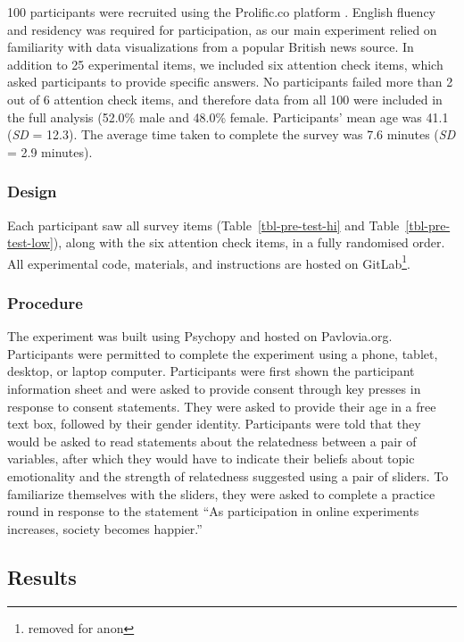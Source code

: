 \documentclass[manuscript,screen,review]{acmart}
\begin{document}
100 participants were recruited using the Prolific.co platform
\citep{prolific}. English fluency and residency was required for
participation, as our main experiment relied on familiarity with data
visualizations from a popular British news source. In addition to 25
experimental items, we included six attention check items, which asked
participants to provide specific answers. No participants failed more
than 2 out of 6 attention check items, and therefore data from all 100
were included in the full analysis (52.0\% male and 48.0\% female.
Participants' mean age was 41.1 (\emph{SD} = 12.3). The average time
taken to complete the survey was 7.6 minutes (\emph{SD} = 2.9 minutes).

\subsubsection{Design}\label{sec-design-pre}

Each participant saw all survey items (Table~\ref{tbl-pre-test-hi} and
Table~\ref{tbl-pre-test-low}), along with the six attention check items,
in a fully randomised order. All experimental code, materials, and
instructions are hosted on GitLab\footnote{removed for anon}.

\subsubsection{Procedure}\label{sec-procedure-pre}

The experiment was built using Psychopy \citep{pierce_2019} and hosted
on Pavlovia.org. Participants were permitted to complete the experiment
using a phone, tablet, desktop, or laptop computer. Participants were
first shown the participant information sheet and were asked to provide
consent through key presses in response to consent statements. They were
asked to provide their age in a free text box, followed by their gender
identity. Participants were told that they would be asked to read
statements about the relatedness between a pair of variables, after
which they would have to indicate their beliefs about topic emotionality
and the strength of relatedness suggested using a pair of sliders. To
familiarize themselves with the sliders, they were asked to complete a
practice round in response to the statement ``As participation in online
experiments increases, society becomes happier.''

\subsection{Results}\label{sec-results-pre}
\end{document}
